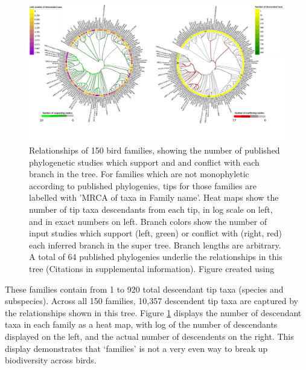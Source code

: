 \documentclass[oupdraft]{sysbio_sse}
\begin{document}
\begin{figure}[!h]
\centering\includegraphics[width=\textwidth]{bird_fam_fig}

\caption{Relationships of 150 bird families, showing the number of published phylogenetic studies which support and and conflict with each branch in the tree. For families which are not monophyletic according to published phylogenies, tips for those families are labelled with 'MRCA of taxa in Family name'. Heat maps show the number of tip taxa descendants from each tip, in log scale on left, and in exact numbers on left. Branch colors show the number of input studies which support (left, green) or conflict with (right, red) each inferred branch in the super tree. Branch lengths are arbitrary. A total of 64 published phylogenies underlie the relationships in this tree (Citations in supplemental information). Figure created using \citep{letunic_interactive_2019}}
\label{birdfams}
\end{figure}

These families contain from 1 to 920 total descendant tip taxa (species and subspecies).
Across all 150 families, 10,357 descendent tip taxa  are captured by the relationships shown in this tree.
Figure \ref{birdfams} displays the number of descendant taxa in each family as a heat map, with log of the number of descendants displayed on the left, and the actual number of descendents on the right.
This display demonstrates that `families' is not a very even way to break up biodiversity across birds.
\end{document}
